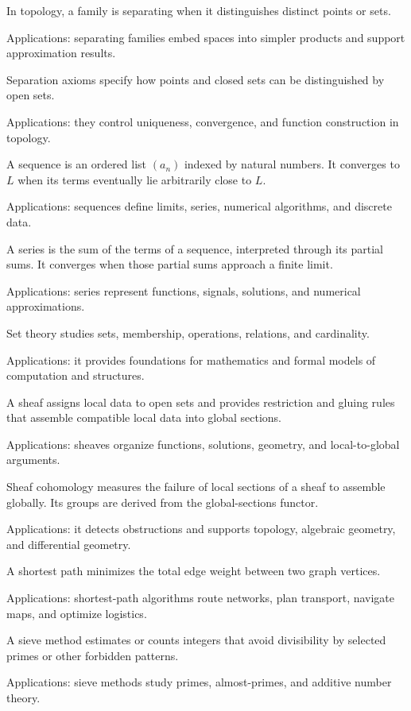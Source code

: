 In topology, a family is separating when it distinguishes distinct points or sets. \par\noindent Applications: separating families embed spaces into simpler products and support approximation results.

Separation axioms specify how points and closed sets can be distinguished by open sets. \par\noindent Applications: they control uniqueness, convergence, and function construction in topology.

A sequence is an ordered list $(a_n)$ indexed by natural numbers. It converges to $L$ when its terms eventually lie arbitrarily close to $L$. \par\noindent Applications: sequences define limits, series, numerical algorithms, and discrete data.

A series is the sum of the terms of a sequence, interpreted through its partial sums. It converges when those partial sums approach a finite limit. \par\noindent Applications: series represent functions, signals, solutions, and numerical approximations.

Set theory studies sets, membership, operations, relations, and cardinality. \par\noindent Applications: it provides foundations for mathematics and formal models of computation and structures.

A sheaf assigns local data to open sets and provides restriction and gluing rules that assemble compatible local data into global sections. \par\noindent Applications: sheaves organize functions, solutions, geometry, and local-to-global arguments.

Sheaf cohomology measures the failure of local sections of a sheaf to assemble globally. Its groups are derived from the global-sections functor. \par\noindent Applications: it detects obstructions and supports topology, algebraic geometry, and differential geometry.

A shortest path minimizes the total edge weight between two graph vertices. \par\noindent Applications: shortest-path algorithms route networks, plan transport, navigate maps, and optimize logistics.

A sieve method estimates or counts integers that avoid divisibility by selected primes or other forbidden patterns. \par\noindent Applications: sieve methods study primes, almost-primes, and additive number theory.

